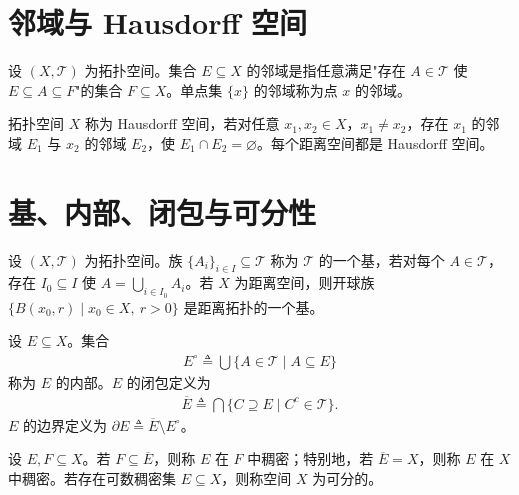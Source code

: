 \documentclass[../main.tex]{subfiles}
\begin{document}
\section{邻域与 Hausdorff 空间}\label{section:appA-邻域Hausdorff}

\begin{definition}[邻域]\label{definition:appA-邻域}
设 $(X,\mathscr{T})$ 为拓扑空间。集合 $E\subseteq X$ 的邻域是指任意满足"存在 $A\in\mathscr{T}$ 使 $E\subseteq A\subseteq F$"的集合 $F\subseteq X$。单点集 $\{x\}$ 的邻域称为点 $x$ 的邻域。
\end{definition}

\begin{definition}[Hausdorff 空间]\label{definition:appA-Hausdorff}
拓扑空间 $X$ 称为 Hausdorff 空间，若对任意 $x_1,x_2\in X$，$x_1\neq x_2$，存在 $x_1$ 的邻域 $E_1$ 与 $x_2$ 的邻域 $E_2$，使 $E_1\cap E_2=\varnothing $。每个距离空间都是 Hausdorff 空间。
\end{definition}

\section{基、内部、闭包与可分性}\label{section:appA-基闭包可分}

\begin{definition}[拓扑的基]\label{definition:appA-基}
设 $(X,\mathscr{T})$ 为拓扑空间。族 $\{A_i\}_{i\in I}\subseteq\mathscr{T}$ 称为 $\mathscr{T}$ 的一个基，若对每个 $A\in\mathscr{T}$，存在 $I_0\subseteq I$ 使 $A=\bigcup_{i\in I_0}A_i$。若 $X$ 为距离空间，则开球族 $\{B(x_0,r)\mid x_0\in X,\ r>0\}$ 是距离拓扑的一个基。
\end{definition}

\begin{definition}[内部、闭包与边界]\label{definition:appA-内部闭包边界}
设 $E\subseteq X$。集合
\begin{align*}
E^\circ\triangleq \bigcup\{A\in\mathscr{T}\mid A\subseteq E\}
\end{align*}
称为 $E$ 的内部。$E$ 的闭包定义为
\begin{align*}
\overline{E}\triangleq \bigcap\{C\supseteq E\mid C^c\in\mathscr{T}\}.
\end{align*}
$E$ 的边界定义为 $\partial E\triangleq \overline{E}\setminus E^\circ$。
\end{definition}

\begin{definition}[稠密与可分]\label{definition:appA-稠密可分}
设 $E,F\subseteq X$。若 $F\subseteq\overline{E}$，则称 $E$ 在 $F$ 中稠密；特别地，若 $\overline{E}=X$，则称 $E$ 在 $X$ 中稠密。若存在可数稠密集 $E\subseteq X$，则称空间 $X$ 为可分的。
\end{definition}
\end{document}

